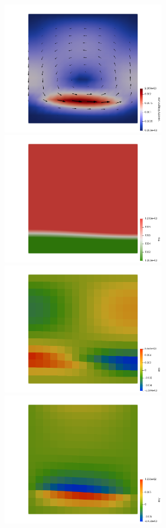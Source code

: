 \begin{center}
\includegraphics[width=7cm]{python_codes/fieldstone_25/images/vel}
\includegraphics[width=7cm]{python_codes/fieldstone_25/images/rho}\\
\includegraphics[width=7cm]{python_codes/fieldstone_25/images/exx}
\includegraphics[width=7cm]{python_codes/fieldstone_25/images/exy}\\

\end{center}

